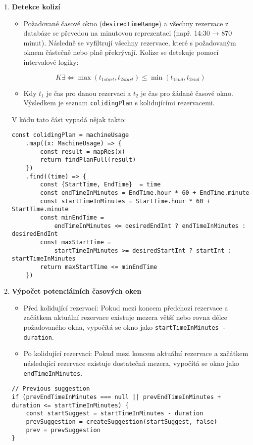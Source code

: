 \begin{enumerate}
    \item \textbf{Detekce kolizí}
    \begin{itemize}
	\item Požadované časové okno (\texttt{desiredTimeRange}) a všechny rezervace z databáze se převedou na minutovou reprezentaci (např. 14:30 → 870 minut). Následně se vyfiltrují všechny rezervace, které s požadovaným oknem částečně nebo plně překrývají. Kolize se detekuje pomocí intervalové logiky:
        \end{itemize}
\[
K \exists \iff \max(t_{1start}, t_{2start}) \leq \min(t_{1end}, t_{2end})
\]
\begin{itemize}
    \item 	Kdy \( t_{1} \) je čas pro danou rezervaci a \( t_{2} \) je čas pro žádané časové okno.
	Výsledkem je seznam \texttt{colidingPlan} s kolidujícími rezervacemi.
\end{itemize}

	V kódu tato část vypadá nějak takto:
	
    \begin{lstlisting}
const colidingPlan = machineUsage
	.map((x: MachineUsage) => {
	    const result = mapRes(x)
	    return findPlanFull(result)
	})
	.find((time) => {
	    const {StartTime, EndTime}  = time
	    const endTimeInMinutes = EndTime.hour * 60 + EndTime.minute
	    const startTimeInMinutes = StartTime.hour * 60 + StartTime.minute
	    const minEndTime =
		    endTimeInMinutes <= desiredEndInt ? endTimeInMinutes : desiredEndInt
	    const maxStartTime =
		    startTimeInMinutes >= desiredStartInt ? startInt : startTimeInMinutes
	    return maxStartTime <= minEndTime
	})
    \end{lstlisting}

    \item \textbf{Výpočet potenciálních časových oken}
    \begin{itemize}
    	\item Před kolidující rezervací: Pokud mezi koncem předchozí rezervace a začátkem aktuální rezervace existuje mezera větší nebo rovna délce požadovaného okna, vypočítá se okno jako \texttt{startTimeInMinutes - duration}.
    	\item Po kolidující rezervací: Pokud mezi koncem aktuální rezervace a začátkem následující rezervace existuje dostatečná mezera, vypočítá se okno jako \texttt{endTimeInMinutes}. 
    \end{itemize}

    \begin{lstlisting}
// Previous suggestion
if (prevEndTimeInMinutes === null || prevEndTimeInMinutes + duration <= startTimeInMinutes) {
    const startSuggest = startTimeInMinutes - duration
    prevSuggestion = createSuggestion(startSuggest, false)
    prev = prevSuggestion
}


\end{lstlisting}
\end{enumerate}

